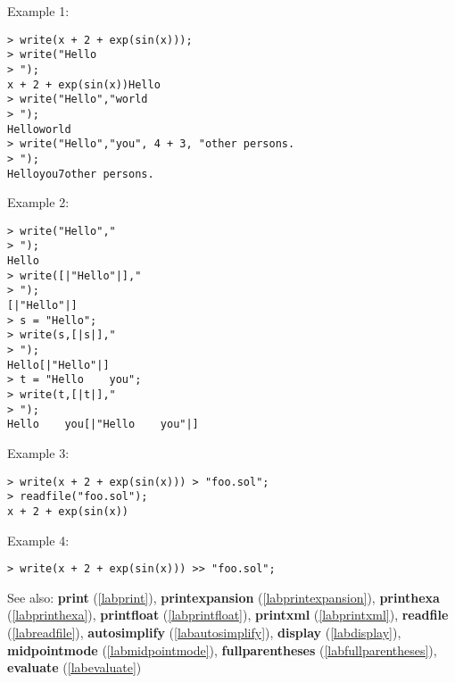 \noindent Example 1: 
\begin{center}\begin{minipage}{15cm}\begin{Verbatim}[frame=single]
> write(x + 2 + exp(sin(x))); 
> write("Hello
> ");
x + 2 + exp(sin(x))Hello
> write("Hello","world
> ");
Helloworld
> write("Hello","you", 4 + 3, "other persons.
> ");
Helloyou7other persons.
\end{Verbatim}
\end{minipage}\end{center}
\noindent Example 2: 
\begin{center}\begin{minipage}{15cm}\begin{Verbatim}[frame=single]
> write("Hello","
> ");
Hello
> write([|"Hello"|],"
> ");
[|"Hello"|]
> s = "Hello";
> write(s,[|s|],"
> ");
Hello[|"Hello"|]
> t = "Hello    you";
> write(t,[|t|],"
> ");
Hello    you[|"Hello    you"|]
\end{Verbatim}
\end{minipage}\end{center}
\noindent Example 3: 
\begin{center}\begin{minipage}{15cm}\begin{Verbatim}[frame=single]
> write(x + 2 + exp(sin(x))) > "foo.sol";
> readfile("foo.sol");
x + 2 + exp(sin(x))
\end{Verbatim}
\end{minipage}\end{center}
\noindent Example 4: 
\begin{center}\begin{minipage}{15cm}\begin{Verbatim}[frame=single]
> write(x + 2 + exp(sin(x))) >> "foo.sol";
\end{Verbatim}
\end{minipage}\end{center}
See also: \textbf{print} (\ref{labprint}), \textbf{printexpansion} (\ref{labprintexpansion}), \textbf{printhexa} (\ref{labprinthexa}), \textbf{printfloat} (\ref{labprintfloat}), \textbf{printxml} (\ref{labprintxml}), \textbf{readfile} (\ref{labreadfile}), \textbf{autosimplify} (\ref{labautosimplify}), \textbf{display} (\ref{labdisplay}), \textbf{midpointmode} (\ref{labmidpointmode}), \textbf{fullparentheses} (\ref{labfullparentheses}), \textbf{evaluate} (\ref{labevaluate})
